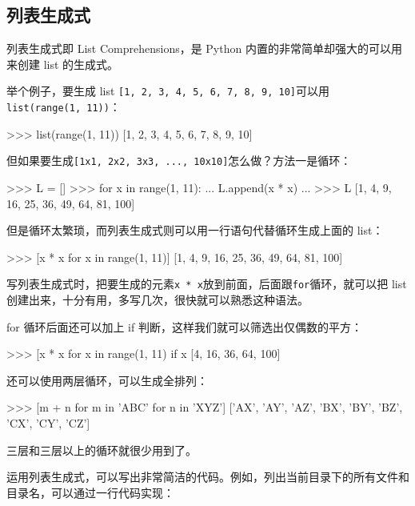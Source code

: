 \hypertarget{ux5217ux8868ux751fux6210ux5f0f}{%
\subsection{列表生成式}\label{ux5217ux8868ux751fux6210ux5f0f}}

列表生成式即 List Comprehensions，是 Python
内置的非常简单却强大的可以用来创建 list 的生成式。

举个例子，要生成 list
\texttt{{[}1,\ 2,\ 3,\ 4,\ 5,\ 6,\ 7,\ 8,\ 9,\ 10{]}}可以用\texttt{list(range(1,\ 11))}：

\begin{pythoncode}
>>> list(range(1, 11))
[1, 2, 3, 4, 5, 6, 7, 8, 9, 10]
\end{pythoncode}

但如果要生成\texttt{{[}1x1,\ 2x2,\ 3x3,\ ...,\ 10x10{]}}怎么做？方法一是循环：

\begin{pythoncode}
>>> L = []
>>> for x in range(1, 11):
...    L.append(x * x)
...
>>> L
[1, 4, 9, 16, 25, 36, 49, 64, 81, 100]
\end{pythoncode}

但是循环太繁琐，而列表生成式则可以用一行语句代替循环生成上面的 list：

\begin{pythoncode}
>>> [x * x for x in range(1, 11)]
[1, 4, 9, 16, 25, 36, 49, 64, 81, 100]
\end{pythoncode}

写列表生成式时，把要生成的元素\texttt{x\ *\ x}放到前面，后面跟\texttt{for}循环，就可以把
list 创建出来，十分有用，多写几次，很快就可以熟悉这种语法。

for 循环后面还可以加上 if 判断，这样我们就可以筛选出仅偶数的平方：

\begin{pythoncode}
>>> [x * x for x in range(1, 11) if x %
[4, 16, 36, 64, 100]
\end{pythoncode}

还可以使用两层循环，可以生成全排列：

\begin{pythoncode}
>>> [m + n for m in 'ABC' for n in 'XYZ']
['AX', 'AY', 'AZ', 'BX', 'BY', 'BZ', 'CX', 'CY', 'CZ']
\end{pythoncode}

三层和三层以上的循环就很少用到了。

运用列表生成式，可以写出非常简洁的代码。例如，列出当前目录下的所有文件和目录名，可以通过一行代码实现：

